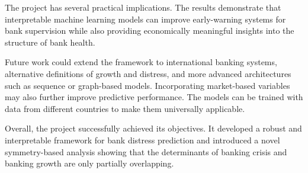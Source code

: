 \documentclass[conference]{IEEEtran}
\begin{document}
The project has several practical implications. The results demonstrate that interpretable machine learning models can improve early-warning systems for bank supervision while also providing economically meaningful insights into the structure of bank health. 

Future work could extend the framework to international banking systems, alternative definitions of growth and distress, and more advanced architectures such as sequence or graph-based models. Incorporating market-based variables may also further improve predictive performance. The models can be trained with data from different countries to make them universally applicable.

Overall, the project successfully achieved its objectives. It developed a robust and interpretable framework for bank distress prediction and introduced a novel symmetry-based analysis showing that the determinants of banking crisis and banking growth are only partially overlapping.
\end{document}
